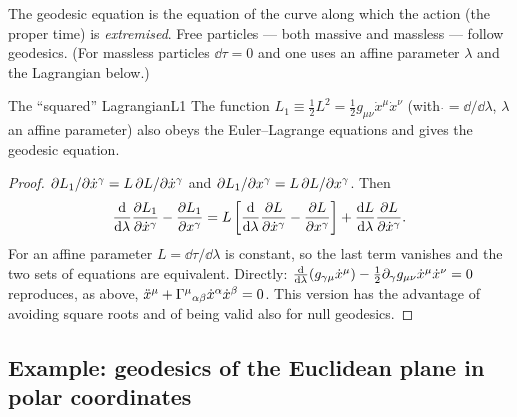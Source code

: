 \begin{keyresult}
The geodesic equation is the equation of the curve along which the action (the proper time) is \emph{extremised}. Free particles --- both massive and massless --- follow geodesics. (For massless particles $\dd\tau=0$ and one uses an affine parameter $\lambda$ and the Lagrangian below.)
\end{keyresult}

\begin{proposition}{The ``squared'' Lagrangian}{L1}
The function $L_1\equiv\frac12L^2=\frac12 g_{\mu\nu}\dot x^\mu\dot x^\nu$ (with $\dot{}=\dd/\dd\lambda$, $\lambda$ an affine parameter) also obeys the Euler--Lagrange equations and gives the geodesic equation.
\end{proposition}
\begin{proof}
$\partial L_1/\partial\dot x^\gamma=L\,\partial L/\partial\dot x^\gamma$ and $\partial L_1/\partial x^\gamma=L\,\partial L/\partial x^\gamma$. Then
\[
\frac{\mathrm{d}}{\mathrm{d}\lambda}\frac{\partial L_1}{\partial\dot x^\gamma}-\frac{\partial L_1}{\partial x^\gamma}=L\left[\frac{\mathrm{d}}{\mathrm{d}\lambda}\frac{\partial L}{\partial\dot x^\gamma}-\frac{\partial L}{\partial x^\gamma}\right]+\frac{\mathrm{d} L}{\mathrm{d}\lambda}\frac{\partial L}{\partial\dot x^\gamma}.
\]
For an affine parameter $L=\dd\tau/\dd\lambda$ is constant, so the last term vanishes and the two sets of equations are equivalent. Directly: $\frac{\mathrm{d}}{\mathrm{d}\lambda}(g_{\gamma\mu}\dot x^\mu)-\frac12\partial_\gamma g_{\mu\nu}\dot x^\mu\dot x^\nu=0$ reproduces, as above, $\ddot x^\mu+\Gamma^{\mu}{}_{\alpha\beta}\dot x^\alpha\dot x^\beta=0$. This version has the advantage of avoiding square roots and of being valid also for null geodesics.
\end{proof}

\subsection{Example: geodesics of the Euclidean plane in polar coordinates}

